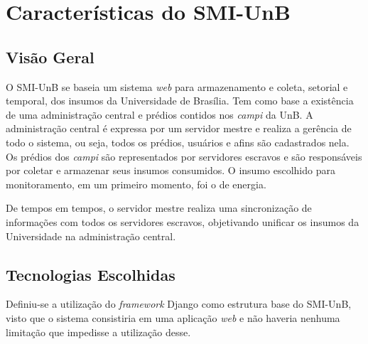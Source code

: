 \chapter{Características do SMI-UnB}
\section{Visão Geral}
O SMI-UnB se baseia um sistema \textit{web} para armazenamento e coleta, setorial e temporal, dos insumos da Universidade de Brasília. Tem como base a existência de uma administração central e prédios contidos nos \textit{campi} da UnB. A administração central é expressa por um servidor mestre e realiza a gerência de todo o sistema, ou seja, todos os prédios, usuários e afins são cadastrados nela. Os prédios dos \textit{campi} são representados por servidores escravos e são responsáveis por coletar e armazenar seus insumos consumidos. O insumo escolhido para monitoramento, em um primeiro momento, foi o de energia.

De tempos em tempos, o servidor mestre realiza uma sincronização de informações com todos os servidores escravos, objetivando unificar os insumos da Universidade na administração central.

\section{Tecnologias Escolhidas}
Definiu-se a utilização do \textit{framework} Django \cite{django_project} como estrutura base do SMI-UnB, visto que o sistema consistiria em uma aplicação \textit{web} e não haveria nenhuma limitação que impedisse a utilização desse.

